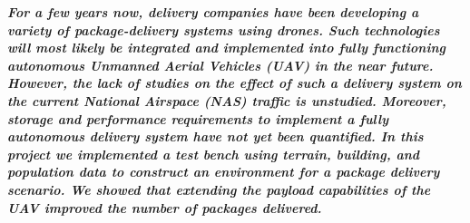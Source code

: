 \textbf{\textit{For a few years now, delivery companies have been developing a variety of package-delivery systems using drones. Such technologies will most likely be integrated and implemented into fully functioning autonomous Unmanned Aerial Vehicles (UAV) in the near future. However, the lack of studies on the effect of such a delivery system on the current National Airspace (NAS) traffic is unstudied.  Moreover, storage and performance requirements to implement a fully autonomous delivery system have not yet been quantified. In this project we implemented a test bench using terrain, building, and population data to construct an environment for a package delivery scenario. We showed that extending the payload capabilities of the UAV improved the number of packages delivered.} }

